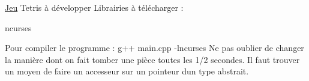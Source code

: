 \hyperlink{classJeu}{Jeu} Tetris à développer Librairies à télécharger \+:
\begin{DoxyItemize}
\item ncurses
\end{DoxyItemize}

Pour compiler le programme \+: g++ main.\+cpp -\/lncurses Ne pas oublier de changer la manière dont on fait tomber une pièce toutes les 1/2 secondes. Il faut trouver un moyen de faire un accesseur sur un pointeur d\textquotesingle{}un type abstrait. 